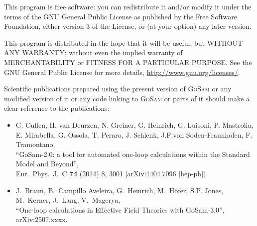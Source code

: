 \documentclass[11pt,a4paper]{refrep}
\newcommand{\gosam}{\textsc{GoSam}\xspace}
\begin{document}
    This program is free software: you can redistribute it and/or modify
    it under the terms of the GNU General Public License as published by
    the Free Software Foundation, either version 3 of the License, or
    (at your option) any later version.

    This program is distributed in the hope that it will be useful,
    but WITHOUT ANY WARRANTY; without even the implied warranty of
    MERCHANTABILITY or FITNESS FOR A PARTICULAR PURPOSE.  See the
    GNU General Public License for more details, 
    \url{http://www.gnu.org/licenses/}.

   
    Scientific publications prepared using the present version of
    \gosam or any modified version of it or any code linking to
    \gosam or parts of it should make a clear reference to the publications:

    \begin{itemize}
       \item  G. Cullen,  H. van Deurzen, N. Greiner, G. Heinrich, G. Luisoni, 
              P. Mastrolia, E. Mirabella, G. Ossola, T. Peraro, J. Schlenk, 
	      J.F.von Soden-Fraunhofen, F. Tramontano, \\
	``GoSam-2.0: a tool for automated one-loop calculations within the Standard Model and Beyond'',\\
	Eur.\ Phys.\ J.\ C {\bf 74} (2014) 8,  3001 [arXiv:1404.7096 [hep-ph]].
      \item   J.~Braun, B.~Campillo Aveleira, G.~Heinrich, M.~H\"ofer, S.P. Jones, M.~Kerner, J.~Lang, V.~Magerya, \\
        ``One-loop calculations in Effective Field Theories with GoSam-3.0'',\\
        arXiv:2507.xxxx.
     \end{itemize}





\begin{fullpage}

\end{fullpage}

\clearpage
\remarks
\end{document}
